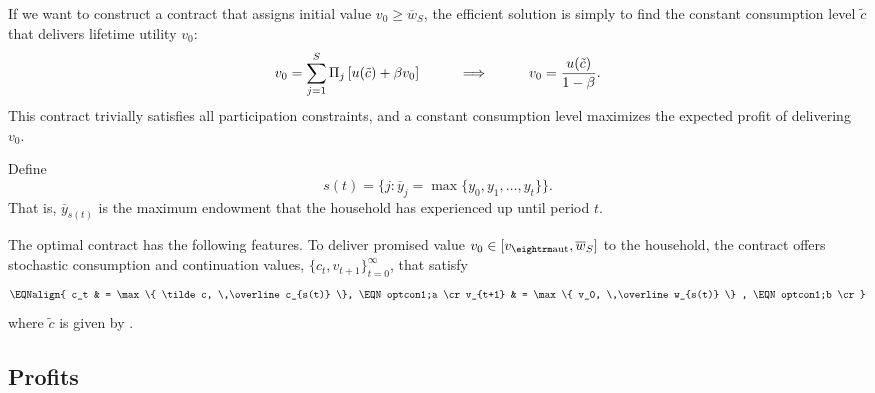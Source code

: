If we want to construct a contract that assigns initial value
$v_0 \geq \overline w_S$, the efficient solution is simply to
find the constant consumption level $\tilde c$ that delivers lifetime
utility $v_0$:
$$
v_0 = \sum_{j=1}^S \Pi_j \left[u(\tilde c) + \beta v_0 \right]
 \hskip1cm \Longrightarrow \hskip1cm
v_0 = { u(\tilde c) \over 1-\beta}.
$$
This contract trivially satisfies  all participation constraints, and
a constant consumption level maximizes the expected profit of delivering
$v_0$.

\vfil\eject
{}
\smallskip



\noindent
Define
$$ s(t) = \{ j: \overline y_j  = \max\{y_0, y_1, \ldots, y_t\} \}.   $$
That is, $\overline y_{s(t)}$ is the maximum endowment that the
household has experienced up  until period $t$.

The optimal contract has the following features.
To deliver promised value $v_0 \in [v_{\rm aut}, \overline w_S]$ to the household,
the contract offers stochastic consumption and continuation values,
$\{c_t, v_{t+1}\}_{t=0}^{\infty}$, that satisfy
$$\EQNalign{ c_t & = \max\{ \tilde c, \,\overline c_{s(t)} \}, \EQN optcon1;a \cr
             v_{t+1} & = \max\{ v_0, \,\overline w_{s(t)} \} , \EQN optcon1;b \cr}$$
where $\tilde c$ is given by .



\subsection{Profits}

